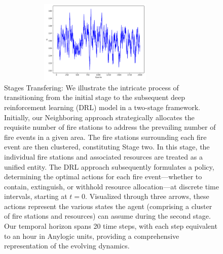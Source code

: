 \documentclass[lettersize,journal]{IEEEtran}
\begin{document}
      \begin{figure}
        \centering
        \includegraphics[height=4cm,width=9.5cm]{figs/manager_G.png}
        \caption{Stages Transfering: We illustrate the intricate process of transitioning from the initial stage to the subsequent deep reinforcement learning (DRL) model in a two-stage framework. Initially, our Neighboring approach strategically allocates the requisite number of fire stations to address the prevailing number of fire events in a given area. The fire stations surrounding each fire event are then clustered, constituting Stage two. In this stage, the individual fire stations and associated resources are treated as a unified entity. The DRL approach subsequently formulates a policy, determining the optimal actions for each fire event—whether to contain, extinguish, or withhold resource allocation—at discrete time intervals, starting at $t=0$. Visualized through three arrows, these actions represent the various states the agent (comprising a cluster of fire stations and resources) can assume during the second stage. Our temporal horizon spans 20 time steps, with each step equivalent to an hour in Anylogic units, providing a comprehensive representation of the evolving dynamics.}\end{figure}
      
\end{document}
